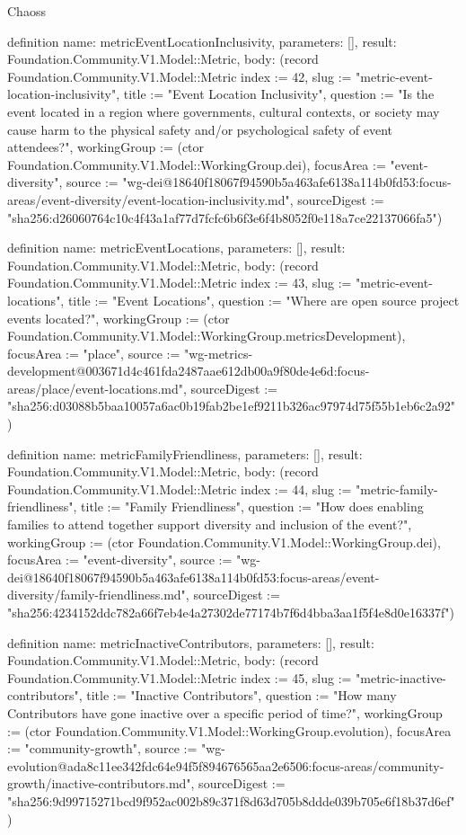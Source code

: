 \begin{lexlean}{Chaoss}
\begin{semanticmodule}
definition{
  name: metricEventLocationInclusivity,
  parameters: [],
  result: Foundation.Community.V1.Model::Metric,
  body: (record Foundation.Community.V1.Model::Metric {index := 42, slug := "metric-event-location-inclusivity", title := "Event Location Inclusivity", question := "Is the event located in a region where governments, cultural contexts, or society may cause harm to the physical safety and/or psychological safety of event attendees?", workingGroup := (ctor Foundation.Community.V1.Model::WorkingGroup.dei), focusArea := "event-diversity", source := "wg-dei@18640f18067f94590b5a463afe6138a114b0fd53:focus-areas/event-diversity/event-location-inclusivity.md", sourceDigest := "sha256:d26060764c10c4f43a1af77d7fcfc6b6f3e6f4b8052f0e118a7ce22137066fa5"})
}

definition{
  name: metricEventLocations,
  parameters: [],
  result: Foundation.Community.V1.Model::Metric,
  body: (record Foundation.Community.V1.Model::Metric {index := 43, slug := "metric-event-locations", title := "Event Locations", question := "Where are open source project events located?", workingGroup := (ctor Foundation.Community.V1.Model::WorkingGroup.metricsDevelopment), focusArea := "place", source := "wg-metrics-development@003671d4c461fda2487aae612db00a9f80de4e6d:focus-areas/place/event-locations.md", sourceDigest := "sha256:d03088b5baa10057a6ac0b19fab2be1ef9211b326ac97974d75f55b1eb6c2a92"})
}

definition{
  name: metricFamilyFriendliness,
  parameters: [],
  result: Foundation.Community.V1.Model::Metric,
  body: (record Foundation.Community.V1.Model::Metric {index := 44, slug := "metric-family-friendliness", title := "Family Friendliness", question := "How does enabling families to attend together support diversity and inclusion of the event?", workingGroup := (ctor Foundation.Community.V1.Model::WorkingGroup.dei), focusArea := "event-diversity", source := "wg-dei@18640f18067f94590b5a463afe6138a114b0fd53:focus-areas/event-diversity/family-friendliness.md", sourceDigest := "sha256:4234152ddc782a66f7eb4e4a27302de77174b7f6d4bba3aa1f5f4e8d0e16337f"})
}

definition{
  name: metricInactiveContributors,
  parameters: [],
  result: Foundation.Community.V1.Model::Metric,
  body: (record Foundation.Community.V1.Model::Metric {index := 45, slug := "metric-inactive-contributors", title := "Inactive Contributors", question := "How many Contributors have gone inactive over a specific period of time?", workingGroup := (ctor Foundation.Community.V1.Model::WorkingGroup.evolution), focusArea := "community-growth", source := "wg-evolution@ada8c11ee342fdc64e94f5f894676565aa2e6506:focus-areas/community-growth/inactive-contributors.md", sourceDigest := "sha256:9d99715271bcd9f952ac002b89c371f8d63d705b8ddde039b705e6f18b37d6ef"})
}


\end{semanticmodule}
\end{lexlean}

